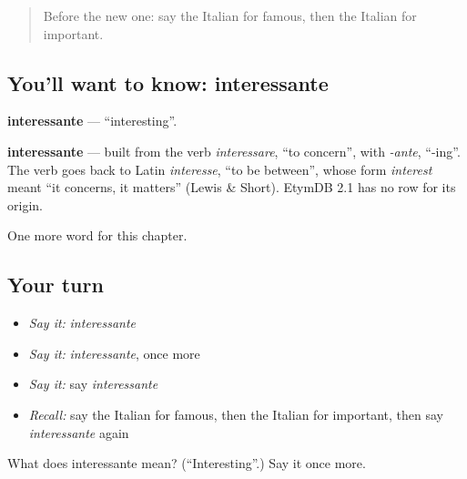 \label{lesson:IT-C125-interessante}



\begin{quote}
Before the new one: say the Italian for famous, then the Italian for important.
\end{quote}

\subsection*{You'll want to know: interessante}
\textbf{interessante} — \textquotedblleft{}interesting\textquotedblright{}.

\begin{cousinweb}
\textbf{interessante} — built from the verb \emph{interessare}, \textquotedblleft{}to concern\textquotedblright{}, with \emph{-ante}, \textquotedblleft{}-ing\textquotedblright{}. The verb goes back to Latin \emph{interesse}, \textquotedblleft{}to be between\textquotedblright{}, whose form \emph{interest} meant \textquotedblleft{}it concerns, it matters\textquotedblright{} (Lewis \& Short). EtymDB 2.1 has no row for its origin.
\end{cousinweb}

\begin{grammarlens}[title={What you've built}]
One more word for this chapter.
\end{grammarlens}

\subsection*{Your turn}
\begin{itemize}
\raggedright
  \item \emph{Say it:} \emph{interessante}
  \item \emph{Say it:} \emph{interessante}, once more
  \item \emph{Say it:} say \emph{interessante}
  \item \emph{Recall:} say the Italian for famous, then the Italian for important, then say \emph{interessante} again
\end{itemize}

\begin{tcolorbox}[breakable,colback=teal!4,colframe=teal!35!black,title={Before you move on}]
What does interessante mean? (\textquotedblleft{}Interesting\textquotedblright{}.) Say it once more.
\end{tcolorbox}
